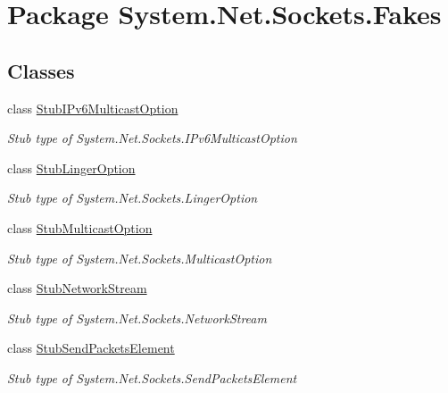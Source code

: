\hypertarget{namespace_system_1_1_net_1_1_sockets_1_1_fakes}{\section{Package System.\-Net.\-Sockets.\-Fakes}
\label{namespace_system_1_1_net_1_1_sockets_1_1_fakes}
}
\subsection*{Classes}
\begin{DoxyCompactItemize}
\item 
class \hyperlink{class_system_1_1_net_1_1_sockets_1_1_fakes_1_1_stub_i_pv6_multicast_option}{Stub\-I\-Pv6\-Multicast\-Option}
\begin{DoxyCompactList}\small\item\em Stub type of System.\-Net.\-Sockets.\-I\-Pv6\-Multicast\-Option\end{DoxyCompactList}\item 
class \hyperlink{class_system_1_1_net_1_1_sockets_1_1_fakes_1_1_stub_linger_option}{Stub\-Linger\-Option}
\begin{DoxyCompactList}\small\item\em Stub type of System.\-Net.\-Sockets.\-Linger\-Option\end{DoxyCompactList}\item 
class \hyperlink{class_system_1_1_net_1_1_sockets_1_1_fakes_1_1_stub_multicast_option}{Stub\-Multicast\-Option}
\begin{DoxyCompactList}\small\item\em Stub type of System.\-Net.\-Sockets.\-Multicast\-Option\end{DoxyCompactList}\item 
class \hyperlink{class_system_1_1_net_1_1_sockets_1_1_fakes_1_1_stub_network_stream}{Stub\-Network\-Stream}
\begin{DoxyCompactList}\small\item\em Stub type of System.\-Net.\-Sockets.\-Network\-Stream\end{DoxyCompactList}\item 
class \hyperlink{class_system_1_1_net_1_1_sockets_1_1_fakes_1_1_stub_send_packets_element}{Stub\-Send\-Packets\-Element}
\begin{DoxyCompactList}\small\item\em Stub type of System.\-Net.\-Sockets.\-Send\-Packets\-Element\end{DoxyCompactList}\item 

\end{DoxyCompactItemize}
